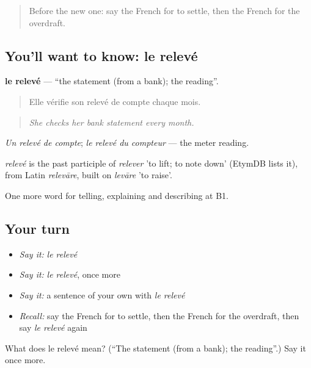 \label{lesson:FR-C451-releve}



\begin{quote}
Before the new one: say the French for to settle, then the French for the overdraft.
\end{quote}

\subsection*{You'll want to know: le relevé}
\textbf{le relevé} — \textquotedblleft{}the statement (from a bank); the reading\textquotedblright{}.

\begin{quote}
Elle vérifie son relevé de compte chaque mois.
\end{quote}

\begin{quote}
\emph{She checks her bank statement every month.}
\end{quote}

\emph{Un relevé de compte}; \emph{le relevé du compteur} — the meter reading.

\begin{cousinweb}
\emph{relevé} is the past participle of \emph{relever} 'to lift; to note down' (EtymDB lists it), from Latin \emph{relevāre}, built on \emph{levāre} 'to raise'.
\end{cousinweb}

\begin{grammarlens}[title={What you've built}]
One more word for telling, explaining and describing at B1.
\end{grammarlens}

\subsection*{Your turn}
\begin{itemize}
\raggedright
  \item \emph{Say it:} \emph{le relevé}
  \item \emph{Say it:} \emph{le relevé}, once more
  \item \emph{Say it:} a sentence of your own with \emph{le relevé}
  \item \emph{Recall:} say the French for to settle, then the French for the overdraft, then say \emph{le relevé} again
\end{itemize}

\begin{tcolorbox}[breakable,colback=teal!4,colframe=teal!35!black,title={Before you move on}]
What does le relevé mean? (\textquotedblleft{}The statement (from a bank); the reading\textquotedblright{}.) Say it once more.
\end{tcolorbox}
